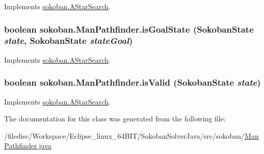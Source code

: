 Implements \hyperlink{classsokoban_1_1AStarSearch_76eb557a34fba75c6b7a5708288cbbe2}{sokoban.AStarSearch}.\hypertarget{classsokoban_1_1ManPathfinder_279eb3ffae4e5ca01fba414916fa9f40}{
\subsubsection[{isGoalState}]{\setlength{\rightskip}{0pt plus 5cm}boolean sokoban.ManPathfinder.isGoalState ({\bf SokobanState} {\em state}, \/  {\bf SokobanState} {\em stateGoal})}}
\label{classsokoban_1_1ManPathfinder_279eb3ffae4e5ca01fba414916fa9f40}




Implements \hyperlink{classsokoban_1_1AStarSearch_8ac8ea41b08c5f3ba2c41e0b0e53c73f}{sokoban.AStarSearch}.\hypertarget{classsokoban_1_1ManPathfinder_b32f8b3f28f89843bf9942f50faed667}{
\subsubsection[{isValid}]{\setlength{\rightskip}{0pt plus 5cm}boolean sokoban.ManPathfinder.isValid ({\bf SokobanState} {\em state})}}
\label{classsokoban_1_1ManPathfinder_b32f8b3f28f89843bf9942f50faed667}




Implements \hyperlink{classsokoban_1_1AStarSearch_d41e3201335321840a0d8bac8a66f86f}{sokoban.AStarSearch}.

The documentation for this class was generated from the following file:\begin{CompactItemize}
\item 
/filedisc/Workspace/Eclipse\_\-linux\_\-64BIT/SokobanSolverJava/src/sokoban/\hyperlink{ManPathfinder_8java}{ManPathfinder.java}\end{CompactItemize}
